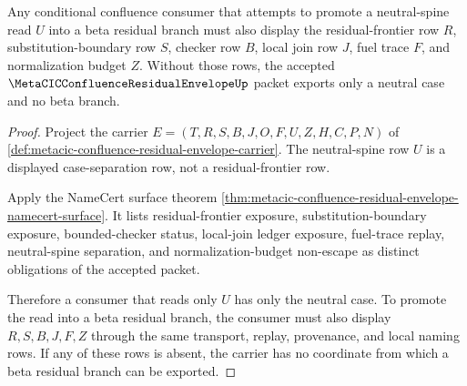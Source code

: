 \begin{theorem}
\label{thm:metacic-confluence-residual-envelope-neutral-spine-separation}
Any conditional confluence consumer that attempts to promote a neutral-spine read $U$ into a beta residual branch must also display the residual-frontier row $R$, substitution-boundary row $S$, checker row $B$, local join row $J$, fuel trace $F$, and normalization budget $Z$. Without those rows, the accepted $\MetaCICConfluenceResidualEnvelopeUp$ packet exports only a neutral case and no beta branch.
\end{theorem}
\begin{proof}
Project the carrier $E=(T,R,S,B,J,O,F,U,Z,H,C,P,N)$ of \autoref{def:metacic-confluence-residual-envelope-carrier}. The neutral-spine row $U$ is a displayed case-separation row, not a residual-frontier row.

Apply the NameCert surface theorem \autoref{thm:metacic-confluence-residual-envelope-namecert-surface}. It lists residual-frontier exposure, substitution-boundary exposure, bounded-checker status, local-join ledger exposure, fuel-trace replay, neutral-spine separation, and normalization-budget non-escape as distinct obligations of the accepted packet.

Therefore a consumer that reads only $U$ has only the neutral case. To promote the read into a beta residual branch, the consumer must also display $R,S,B,J,F,Z$ through the same transport, replay, provenance, and local naming rows. If any of these rows is absent, the carrier has no coordinate from which a beta residual branch can be exported.
\end{proof}

